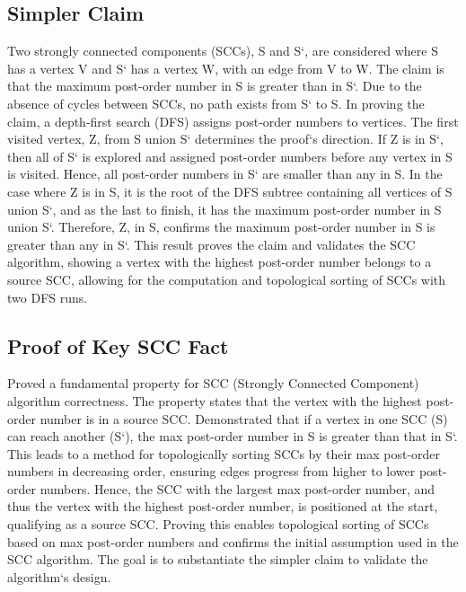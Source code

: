 \subsection*{Simpler Claim}
Two strongly connected components (SCCs), S and S`, are considered where S has a vertex V and S` has a vertex W, with an edge from V to W\@.
The claim is that the maximum post-order number in S is greater than in S`.
Due to the absence of cycles between SCCs, no path exists from S` to S\@.
In proving the claim, a depth-first search (DFS) assigns post-order numbers to vertices.
The first visited vertex, Z, from S union S` determines the proof`s direction.
If Z is in S`, then all of S` is explored and assigned post-order numbers before any vertex in S is visited.
Hence, all post-order numbers in S` are smaller than any in S\@.
In the case where Z is in S, it is the root of the DFS subtree containing all vertices of S union S`, and as the last to finish, it has the maximum post-order number in S union S`.
Therefore, Z, in S, confirms the maximum post-order number in S is greater than any in S`.
This result proves the claim and validates the SCC algorithm, showing a vertex with the highest post-order number belongs to a source SCC, allowing for the computation and topological sorting of SCCs with two DFS runs.

\subsection*{Proof of Key SCC Fact}
Proved a fundamental property for SCC (Strongly Connected Component) algorithm correctness.
The property states that the vertex with the highest post-order number is in a source SCC\@.
Demonstrated that if a vertex in one SCC (S) can reach another (S`), the max post-order number in S is greater than that in S`.
This leads to a method for topologically sorting SCCs by their max post-order numbers in decreasing order, ensuring edges progress from higher to lower post-order numbers.
Hence, the SCC with the largest max post-order number, and thus the vertex with the highest post-order number, is positioned at the start, qualifying as a source SCC\@.
Proving this enables topological sorting of SCCs based on max post-order numbers and confirms the initial assumption used in the SCC algorithm.
The goal is to substantiate the simpler claim to validate the algorithm`s design.

